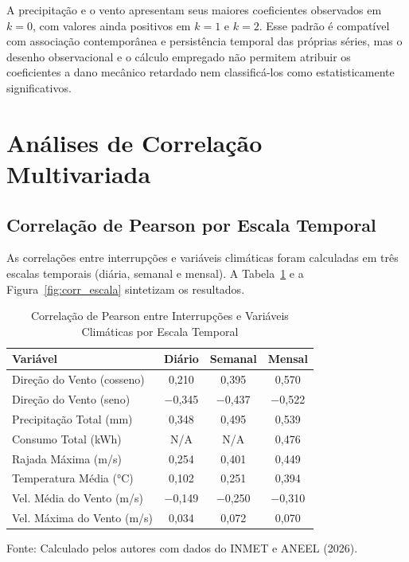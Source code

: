A precipitação e o vento apresentam seus maiores coeficientes observados em $k=0$, com valores ainda positivos em $k=1$ e $k=2$. Esse padrão é compatível com associação contemporânea e persistência temporal das próprias séries, mas o desenho observacional e o cálculo empregado não permitem atribuir os coeficientes a dano mecânico retardado nem classificá-los como estatisticamente significativos.

\section{Análises de Correlação Multivariada}\label{sec:pearson}

\subsection{Correlação de Pearson por Escala Temporal}

As correlações entre interrupções e variáveis climáticas foram calculadas em três escalas temporais (diária, semanal e mensal). A Tabela~\ref{tab:correlacoes} e a Figura~\ref{fig:corr_escala} sintetizam os resultados.

\begin{table}[H]
\caption{Correlação de Pearson entre Interrupções e Variáveis Climáticas por Escala Temporal}
\label{tab:correlacoes}
\begin{center}
\small
\begin{tabular}{lccc}
\toprule
\textbf{Variável} & \textbf{Diário} & \textbf{Semanal} & \textbf{Mensal} \\
\midrule
Direção do Vento (cosseno) & 0,210 & 0,395 & 0,570 \\
Direção do Vento (seno) & $-$0,345 & $-$0,437 & $-$0,522 \\
Precipitação Total (mm) & 0,348 & 0,495 & 0,539 \\
Consumo Total (kWh) & N/A & N/A & 0,476 \\
Rajada Máxima (m/s) & 0,254 & 0,401 & 0,449 \\
Temperatura Média (°C) & 0,102 & 0,251 & 0,394 \\
Vel. Média do Vento (m/s) & $-$0,149 & $-$0,250 & $-$0,310 \\
Vel. Máxima do Vento (m/s) & 0,034 & 0,072 & 0,070 \\
\bottomrule
\end{tabular}
\normalsize
\end{center}
\small{Fonte: Calculado pelos autores com dados do INMET e ANEEL (2026).}
\end{table}

